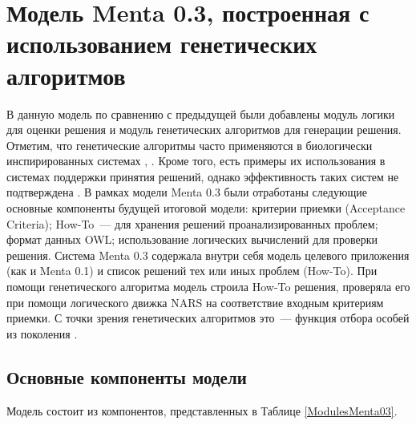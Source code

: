 \section{Модель Menta 0.3, построенная с использованием генетических алгоритмов} \label{chapt2}
В данную модель по сравнению с предыдущей были добавлены модуль логики для оценки решения и модуль генетических алгоритмов для генерации решения. Отметим, что генетические алгоритмы часто применяются в биологически инспирированных системах \cite{G1}, \cite{G3}. Кроме того, есть примеры их использования в системах поддержки принятия решений, однако эффективность таких систем не подтверждена \cite{G2}. В рамках модели Menta 0.3 были отработаны следующие основные компоненты будущей итоговой модели: критерии приемки (Acceptance Criteria); How-To~--- для хранения решений проанализированных проблем; формат данных OWL; использование логических вычислений для проверки решения. Система Menta 0.3 содержала внутри себя модель целевого приложения (как и Menta 0.1) и список решений тех или иных проблем (How-To). При помощи генетического алгоритма модель строила How-To решения, проверяла его при помощи логического движка NARS \cite{NARS} на соответствие входным критериям приемки. С точки зрения генетических алгоритмов это~--- функция отбора особей из поколения \cite{GFITNESS}. 

\subsection{Основные компоненты модели}
Модель состоит из компонентов, представленных в Таблице \ref{ModulesMenta03}.

